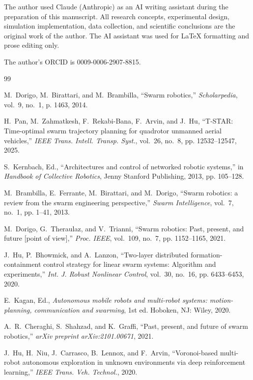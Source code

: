 \documentclass[journal,compsoc]{IEEEtran}
\begin{document}
The author used Claude (Anthropic) as an AI writing assistant during the preparation
of this manuscript. All research concepts, experimental design, simulation implementation,
data collection, and scientific conclusions are the original work of the author. The AI
assistant was used for LaTeX formatting and prose editing only.

The author's ORCID is 0009-0006-2907-8815.

\begin{thebibliography}{99}

M.~Dorigo, M.~Birattari, and M.~Brambilla, ``Swarm robotics,'' \emph{Scholarpedia}, vol.~9, no.~1, p. 1463, 2014.

H.~Pan, M.~Zahmatkesh, F.~Rekabi-Bana, F.~Arvin, and J.~Hu, ``T-STAR: Time-optimal swarm trajectory planning for quadrotor unmanned aerial vehicles,'' \emph{IEEE Trans. Intell. Transp. Syst.}, vol.~26, no.~8, pp. 12532--12547, 2025.

S.~Kernbach, Ed., ``Architectures and control of networked robotic systems,'' in \emph{Handbook of Collective Robotics}, Jenny Stanford Publishing, 2013, pp. 105--128.

M.~Brambilla, E.~Ferrante, M.~Birattari, and M.~Dorigo, ``Swarm robotics: a review from the swarm engineering perspective,'' \emph{Swarm Intelligence}, vol.~7, no.~1, pp. 1--41, 2013.

M.~Dorigo, G.~Theraulaz, and V.~Trianni, ``Swarm robotics: Past, present, and future [point of view],'' \emph{Proc. IEEE}, vol.~109, no.~7, pp. 1152--1165, 2021.

J.~Hu, P.~Bhowmick, and A.~Lanzon, ``Two-layer distributed formation-containment control strategy for linear swarm systems: Algorithm and experiments,'' \emph{Int. J. Robust Nonlinear Control}, vol.~30, no.~16, pp. 6433--6453, 2020.

E.~Kagan, Ed., \emph{Autonomous mobile robots and multi-robot systems: motion-planning, communication and swarming}, 1st ed. Hoboken, NJ: Wiley, 2020.

A.~R.~Cheraghi, S.~Shahzad, and K.~Graffi, ``Past, present, and future of swarm robotics,'' \emph{arXiv preprint arXiv:2101.00671}, 2021.

J.~Hu, H.~Niu, J.~Carrasco, B.~Lennox, and F.~Arvin, ``Voronoi-based multi-robot autonomous exploration in unknown environments via deep reinforcement learning,'' \emph{IEEE Trans. Veh. Technol.}, 2020.


\end{thebibliography}
\end{document}
